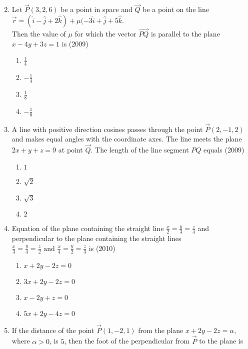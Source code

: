 \begin{enumerate}
\begin{multicols}{2}
\begin{enumerate}
    	\end{enumerate}
    \end{multicols}
    \item Let $\vec{P}(3,2,6)$ be a point in space and $\vec{Q}$ be a point on the line \\ 
    $\vec{r} = (\hat{i} - \hat{j} + 2\hat{k}) + \mu(-3\hat{i} +\hat{j}+5\hat{k}.$
    \\ Then the value of $\mu$ for which the vector $\overrightarrow{PQ}$ is parallel to the plane $x-4y+3z=1$ is
    \hfill{(2009)}
    \begin{multicols}{2}
    	\begin{enumerate}
    		\item $\frac{1}{4}$
    		\item $-\frac{1}{4}$
    		\item $\frac{1}{8}$
    		\item $-\frac{1}{8}$
    	\end{enumerate}
    \end{multicols}
    \item A line with positive direction cosines passes through the point $\vec{P}(2,-1,2)$ and makes equal angles with the coordinate axes. The line meets the plane $2x+y+z=9$ at point $\vec{Q}$. The length of the line segment $PQ$ equals 
    \hfill{(2009)}
    \begin{multicols}{2}
    	\begin{enumerate}
    		\item $1$
    		\item $\sqrt{2}$
    		\item $\sqrt{3}$
    		\item $2$
    	\end{enumerate}
    \end{multicols}
    \item Equation of the plane containing the straight line $\frac{x}{2}=\frac{y}{3}=\frac{z}{4}$ and perpendicular to the plane containing the straight lines $\frac{x}{3}=\frac{y}{4}=\frac{z}{2} \text{ and } \frac{x}{4}=\frac{y}{2}=\frac{z}{3}$ is 
    \hfill{(2010)}
    \begin{enumerate}
    	\item $x+2y-2z=0$
    	\item $3x+2y-2z=0$
    	\item $x-2y+z=0$
    	\item $5x+2y-4z=0$
    \end{enumerate}
    \item If the distance of the point $\vec{P}(1,-2,1)$ from the plane $x+2y-2z=\alpha$, where $\alpha>0$, is $5$, then the foot of the perpendicular from $\vec{P}$ to the plane is

\end{enumerate}
